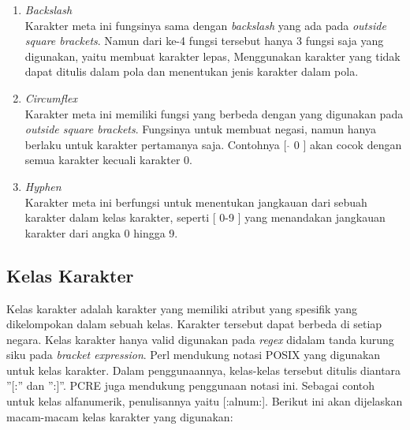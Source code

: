 \begin{enumerate}
	\item \textit{Backslash} \\
	Karakter meta ini fungsinya sama dengan \textit{backslash} yang ada pada \textit{outside square brackets}. Namun dari ke-4 fungsi tersebut hanya 3 fungsi saja yang digunakan, yaitu membuat karakter lepas, Menggunakan karakter yang tidak dapat ditulis dalam pola dan menentukan jenis karakter dalam pola.
	
	\item \textit{Circumflex} \\
	Karakter meta ini memiliki fungsi yang berbeda dengan yang digunakan pada \textit{outside square brackets}. Fungsinya untuk membuat negasi, namun hanya berlaku untuk karakter pertamanya saja. Contohnya [ $\hat{}$ 0 ] akan cocok dengan semua karakter kecuali karakter 0.
	
	\item \textit{Hyphen} \\
	Karakter meta ini berfungsi untuk menentukan jangkauan dari sebuah karakter dalam kelas karakter, seperti [ 0-9 ] yang menandakan jangkauan karakter dari angka 0 hingga 9.
	
\end{enumerate}
	
\subsection{Kelas Karakter}

Kelas karakter adalah karakter yang memiliki atribut yang spesifik yang dikelompokan dalam sebuah kelas. Karakter tersebut dapat berbeda di setiap negara. Kelas karakter hanya valid digunakan pada \textit{regex} didalam tanda kurung siku pada \textit{bracket expression}. Perl mendukung notasi POSIX yang digunakan untuk kelas karakter. Dalam penggunaannya, kelas-kelas tersebut ditulis diantara ''[:'' dan '':]''. PCRE juga mendukung penggunaan notasi ini. Sebagai contoh untuk kelas alfanumerik, penulisannya yaitu [:alnum:]. Berikut ini akan dijelaskan macam-macam kelas karakter yang digunakan:

